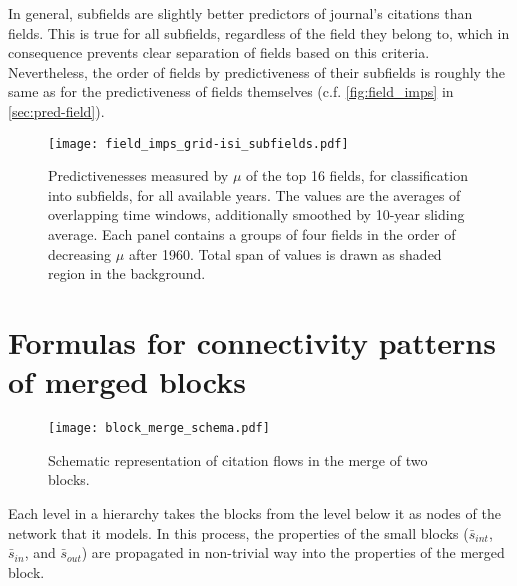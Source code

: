 \documentclass[a4paper,12pt]{article}
\begin{document}
\begin{appendices}
In general, subfields are slightly better predictors of journal's citations than fields. 
This is true for all subfields, regardless of the field they belong to, which in 
consequence prevents clear separation of fields based on this criteria. Nevertheless,
the order of fields by predictiveness of their subfields is roughly the same as for the
predictiveness of fields themselves (c.f. \cref{fig:field_imps} in \cref{sec:pred-field}).

\begin{figure}
      \centering
      \texttt{[image: field\_imps\_grid-isi\_subfields.pdf]}
  \caption{Predictivenesses measured by $\mu$ of the top 16 fields, for classification 
into subfields, for all available years. The values are the averages of overlapping time windows,
additionally smoothed by 10-year sliding average.
Each panel contains a groups of four fields in the order of decreasing $\mu$ after 1960.
Total span of values is drawn as shaded region in the background.
}
  \label{fig:field_imps_sf}
\end{figure}


\section{Formulas for connectivity patterns of merged blocks}
\label{app:block_merge}

\begin{figure}
      \centering
      \texttt{[image: block\_merge\_schema.pdf]}
  \caption{Schematic representation of citation flows in the merge of two blocks.
}
  \label{fig:block_merge}
\end{figure}

Each level in a hierarchy takes the blocks from the level below it as nodes of the network that it models.
In this process, the properties of the small blocks ($\bar{s}_{int}$, $\bar{s}_{in}$, and $\bar{s}_{out}$) are propagated in non-trivial way into the properties of the merged block.


\end{appendices}
\end{document}
